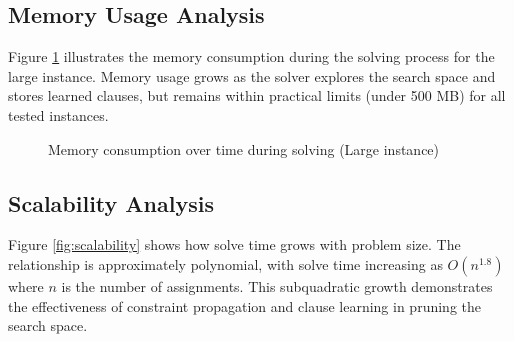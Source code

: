 \documentclass[12pt,a4paper]{article}
\begin{document}
\subsection{Memory Usage Analysis}

Figure \ref{fig:memory} illustrates the memory consumption during the solving process for the large instance. Memory usage grows as the solver explores the search space and stores learned clauses, but remains within practical limits (under 500 MB) for all tested instances.

\begin{figure}[H]
\centering
{}
\caption{Memory consumption over time during solving (Large instance)}
\label{fig:memory}
\end{figure}

\subsection{Scalability Analysis}

Figure \ref{fig:scalability} shows how solve time grows with problem size. The relationship is approximately polynomial, with solve time increasing as $O(n^{1.8})$ where $n$ is the number of assignments. This subquadratic growth demonstrates the effectiveness of constraint propagation and clause learning in pruning the search space.
\end{document}
